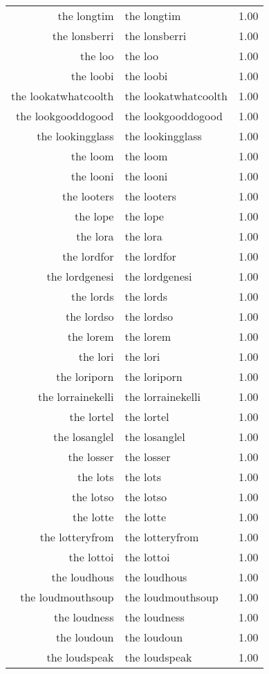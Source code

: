 \begin{table}[ht]
\begin{tabular}{rlr}
  the longtim & the longtim & 1.00 \\ 
  the lonsberri & the lonsberri & 1.00 \\ 
  the loo & the loo & 1.00 \\ 
  the loobi & the loobi & 1.00 \\ 
  the lookatwhatcoolth & the lookatwhatcoolth & 1.00 \\ 
  the lookgooddogood & the lookgooddogood & 1.00 \\ 
  the lookingglass & the lookingglass & 1.00 \\ 
  the loom & the loom & 1.00 \\ 
  the looni & the looni & 1.00 \\ 
  the looters & the looters & 1.00 \\ 
  the lope & the lope & 1.00 \\ 
  the lora & the lora & 1.00 \\ 
  the lordfor & the lordfor & 1.00 \\ 
  the lordgenesi & the lordgenesi & 1.00 \\ 
  the lords & the lords & 1.00 \\ 
  the lordso & the lordso & 1.00 \\ 
  the lorem & the lorem & 1.00 \\ 
  the lori & the lori & 1.00 \\ 
  the loriporn & the loriporn & 1.00 \\ 
  the lorrainekelli & the lorrainekelli & 1.00 \\ 
  the lortel & the lortel & 1.00 \\ 
  the losanglel & the losanglel & 1.00 \\ 
  the losser & the losser & 1.00 \\ 
  the lots & the lots & 1.00 \\ 
  the lotso & the lotso & 1.00 \\ 
  the lotte & the lotte & 1.00 \\ 
  the lotteryfrom & the lotteryfrom & 1.00 \\ 
  the lottoi & the lottoi & 1.00 \\ 
  the loudhous & the loudhous & 1.00 \\ 
  the loudmouthsoup & the loudmouthsoup & 1.00 \\ 
  the loudness & the loudness & 1.00 \\ 
  the loudoun & the loudoun & 1.00 \\ 
  the loudspeak & the loudspeak & 1.00 \\ 

\end{tabular}
\end{table}
